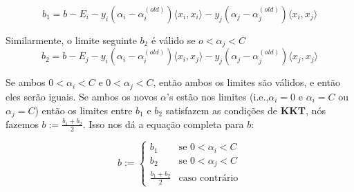 \documentclass{article}
\begin{document}
\begin{equation}\label{b1}b_1 = b-E_i-y_i(\alpha_i-\alpha_i^{(old)})\langle x_i,x_i\rangle-y_j(\alpha_j-\alpha_j^{(old)})\langle x_i,x_j\rangle\end{equation}

Similarmente, o limite seguinte \(b_2\) é válido se \(o<\alpha_j<C\)
\begin{equation}\label{b2}b_2 = b-E_j-y_i(\alpha_i-\alpha_i^{(old)})\langle x_i,x_j\rangle-y_j(\alpha_j-\alpha_j^{(old)})\langle x_j,x_j\rangle\end{equation}

Se ambos \(0<\alpha_i<C\) e \(0<\alpha_j<C\), então ambos os limites são válidos, e então eles serão iguais.
Se ambos os novos \(\alpha\)'s estão nos limites (i.e.,\(\alpha_i=0\) e \(\alpha_i=C\) ou \(\alpha_j=C\)) então os limites entre \(b_1\) e \(b_2\) satisfazem as condições de \textbf{KKT}, nós fazemos \(b:=\frac{b_1+b_2}{2}\). Isso nos dá a equação completa para \(b\):

\begin{equation}\label{b}
b:=\begin{cases}b_1 &\text{se  }0<\alpha_i<C\\
b_2 &\text{se  }0<\alpha_j<C\\
\frac{b_1+b_2}{2} &\text{caso contrário}
\end{cases}
\end{equation}

\makeatletter
\def\BState{\State\hskip-\ALG@thistlm}
\makeatother
\end{document}
